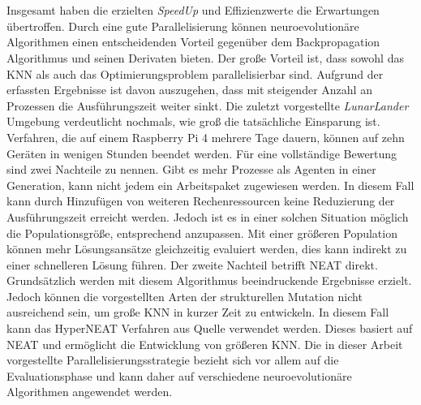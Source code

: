 \\\\
Insgesamt haben die erzielten \emph{SpeedUp} und Effizienzwerte die Erwartungen übertroffen. Durch eine gute Parallelisierung können neuroevolutionäre Algorithmen einen entscheidenden Vorteil gegenüber dem Backpropagation Algorithmus und seinen Derivaten bieten. Der große Vorteil ist, dass sowohl das \ac{KNN} als auch das Optimierungsproblem parallelisierbar sind. Aufgrund der erfassten Ergebnisse ist davon auszugehen, dass mit steigender Anzahl an Prozessen die Ausführungszeit weiter sinkt. Die zuletzt vorgestellte \emph{LunarLander} Umgebung verdeutlicht nochmals, wie groß die tatsächliche Einsparung ist. Verfahren, die auf einem Raspberry Pi 4 mehrere Tage dauern, können auf zehn Geräten in wenigen Stunden beendet werden. Für eine vollständige Bewertung sind zwei Nachteile zu nennen. Gibt es mehr Prozesse als Agenten in einer Generation, kann nicht jedem ein Arbeitspaket zugewiesen werden. In diesem Fall kann durch Hinzufügen von weiteren Rechenressourcen keine Reduzierung der Ausführungszeit erreicht werden. Jedoch ist es in einer solchen Situation möglich die Populationsgröße, entsprechend anzupassen. Mit einer größeren Population können mehr Lösungsansätze gleichzeitig evaluiert werden, dies kann indirekt zu einer schnelleren Lösung führen. Der zweite Nachteil betrifft \ac{NEAT} direkt. Grundsätzlich werden mit diesem Algorithmus beeindruckende Ergebnisse erzielt. Jedoch können die vorgestellten Arten der strukturellen Mutation nicht ausreichend sein, um große \ac{KNN} in kurzer Zeit zu entwickeln. In diesem Fall kann das HyperNEAT Verfahren aus Quelle \cite{stanley2009hyperneat} verwendet werden. Dieses basiert auf \ac{NEAT} und ermöglicht die Entwicklung von größeren \ac{KNN}. Die in dieser Arbeit vorgestellte Parallelisierungsstrategie bezieht sich vor allem auf die Evaluationsphase und kann daher auf verschiedene neuroevolutionäre Algorithmen angewendet werden.

